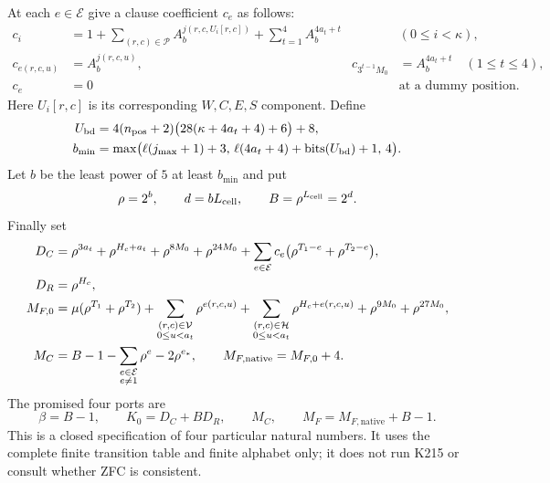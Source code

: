 \documentclass[11pt,a4paper]{article}
\theoremstyle{remark}\newtheorem{remark}[theorem]{Remark}
\newcommand{\bits}{\operatorname{bits}}
\begin{document}
At each $e\in\mathcal E$ give a clause coefficient $c_e$ as follows:
\begin{align*}
 c_i&=1+\sum_{(r,c)\in\mathcal P}A_b^{j(r,c,U_i[r,c])}
               +\sum_{t=1}^{4}A_b^{4a_t+t}
       &&(0\le i<\kappa),\\
 c_{e(r,c,u)}&=A_b^{j(r,c,u)},&
 c_{3^{t-1}M_0}&=A_b^{4a_t+t}\quad(1\le t\le4),\\
 c_e&=0&&\text{at a dummy position}.
\end{align*}
Here $U_i[r,c]$ is its corresponding $W,C,E,S$ component.
Define
\begin{align*}
 U_{\rm bd}&=4(n_{\rm pos}+2)\bigl(28(\kappa+4a_t+4)+6\bigr)+8,\\
 b_{\min}&=\max\bigl(\ell(j_{\max}+1)+3,\,
              \ell(4a_t+4)+\bits(U_{\rm bd})+1,\,4\bigr).
\end{align*}
Let $b$ be the least power of $5$ at least $b_{\min}$ and put
\[
 \rho=2^b,\qquad d=bL_{\rm cell},\qquad B=\rho^{L_{\rm cell}}=2^d.
\]
Finally set
\begin{align}
 D_C={}&\rho^{3a_t}+\rho^{H_c+a_t}+\rho^{8M_0}+\rho^{24M_0}
       +\sum_{e\in\mathcal E}c_e
          \bigl(\rho^{T_1-e}+\rho^{T_2-e}\bigr),\notag\\
 D_R={}&\rho^{H_c},\notag\\
 M_{F,0}={}&\mu(\rho^{T_1}+\rho^{T_2})
       +\sum_{\substack{(r,c)\in\mathcal V\\0\le u<a_t}}\rho^{e(r,c,u)}
       +\sum_{\substack{(r,c)\in\mathcal H\\0\le u<a_t}}
                      \rho^{H_c+e(r,c,u)}
       +\rho^{9M_0}+\rho^{27M_0},\notag\\
 M_C={}&B-1-\sum_{\substack{e\in\mathcal E\\e\ne1}}\rho^e-2\rho^{e_*},
       \qquad M_{F,\mathrm{native}}=M_{F,0}+4. \label{eq:coeffrecipe}
\end{align}
The promised four ports are
\begin{equation}
 \boxed{\quad
 \beta=B-1,\qquad K_0=D_C+BD_R,\qquad
 M_C,\qquad M_F=M_{F,\mathrm{native}}+B-1.\quad}
 \label{eq:ports}
\end{equation}
This is a closed specification of four particular natural numbers.
It uses the complete finite transition table and finite alphabet only;
it does not run K215 or consult whether ZFC is consistent.
\end{document}

